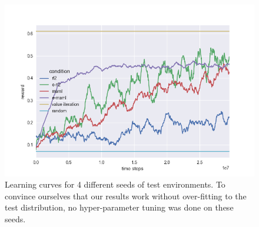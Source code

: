 \documentclass{article} %
\begin{document}
\begin{figure}[H]
\begin{center}
\includegraphics[scale=0.16]{bradly_curves/64testgrid3.png}
\end{center}
\caption{Learning curves for 4 different seeds of test environments. To convince ourselves that our results work without over-fitting to the test distribution, no hyper-parameter tuning was done on these seeds.}
\label{fig:appendix-learning-curves-0}
\end{figure} 
\end{document}
